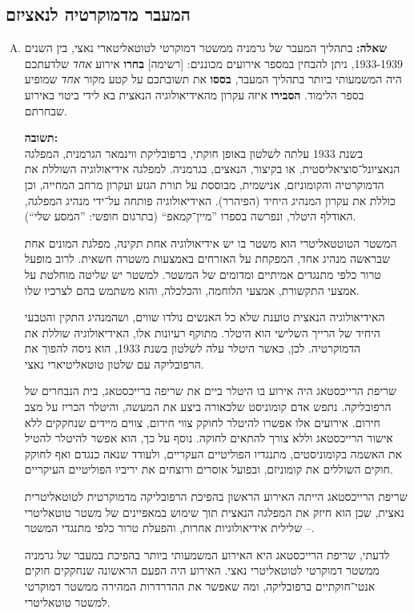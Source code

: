 \documentclass[a4paper]{article}
\begin{document}
	\subsection{המעבר מדמוקרטיה לנאציזם}
		\begin{enumerate}[A.]
			\item \textbf{שאלה: }
			בתהליך המעבר של גרמניה ממשטר דמוקרטי לטוטאליטארי נאצי, בין השנים 1933-1939, ניתן להבחין במספר אירועים מכוננים: [רשימה] \textbf{בחרו} אירוע \textit{אחד} שלדעתכם היה המשמעותי ביותר בתהליך המעבר, \textbf{בססו} את תשובתכם על קטע מקור \textit{אחד} שמופיע בספר הלימוד. \textbf{הסבירו} איזה עקרון מהאידיאולוגיה הנאצית בא לידי ביטוי באירוע שבחרתם. 
			
			\textbf{תשובה: }\\
			בשנת 1933 עלתה לשלטון באופן חוקתי, ברפובליקת ווינמאר הגרמנית, המפלגה הנאציונל־סוציאליסטית, או בקיצור, הנאצים, בגרמניה. למפלגה אידיאולוגיה השוללת את הדמוקרטיה והקומוניזם, אנישמית, מבוססת על תורת הגזע ועקרון מרחב המחייה, וכן כוללת את עקרון המנהיג היחיד (הפיהרר). האידיאולוגיה פותחה על־ידי מנהיג המפלגה, האודלף היטלר, ונפרשה בספרו ''מיין־קמאפ`` (בתרגום חופשי: ''המסע שלי``). 
			
			המשטר הטוטטאליטרי הוא משטר בו יש אידיאולוגיה אחת תקינה, מפלגת המונים אחת שבראשה מנהיג אחד, המפקחת על האזרחים באמצעות משטרה חשאית. לרוב מופעל טרור כלפי מתנגדים אמיתיים ומדומים של המשטר. למשטר יש שליטה מוחלטת על אמצעי התקשורת, אמצעי הלוחמה, והכלכלה, והוא משתמש בהם לצרכיו שלו. 
			
			האידיאולוגיה הנאצית טוענת שלא כל האנשים נולדו שווים, ושהמנהיג התקין והטבעי היחיד של הרייך השלישי הוא היטלר. מתוקף רעיונות אלו, האידיאולוגיה שוללת את הדמוקרטיה. לכן, כאשר היטלר עלה לשלטון בשנת 1933, הוא ניסה להפוך את הרפובליקה עם שלטון טוטאליטיארי נאצי. 
			
			שריפת הרייכסטאג היה אירוע בו היטלר ביים את שריפה ברייכסטאג, בית הנבחרים של הרפובליקה. נתפש אדם קומוניסט שלכאורה ביצע את המעשה, והיטלר הכריז על מצב חירום. אירועים אלו אפשרו להיטלר לחוקק צווי חירום, צווים מיידים שנחקקים ללא אישור הרייכסטאג וללא צורך להתאים לחוקה. נוסף על כך, הוא אפשר להיטלר להטיל את האשמה בקומוניסטים, מתנגדיו הפוליטיים העקריים, ולעודד שנאה כנגדם ואף לחוקק חוקים השוללים את קומוניזם, ובפועל אוסרים ורוצחים את יריביו הפוליטיים העיקריים. 
			
			שריפת הרייכסטאג הייתה האירוע הראשון בהפיכת הרפובליקה מדמוקרטית לטוטאליטרית נאצית, שכן הוא חיזק את המפלגה הנאצית תוך שימוש במאפיינים של משטר טוטאליטרי – שלילית אידיאולוגיות אחרות, והפעלת טרור כלפי מתנגדי המשטר. 
			
			לדעתי, שריפת הרייכסטאג היא האירוע המשמעותי ביותר בהפיכת במעבר של גרמניה ממשטר דמוקרטי לטוטאליטרי נאצי. האירוע היה הפעם הראשונה שנחקקים חוקים אנטי־חוקתיים ברפובליקה, ומה שאפשר את ההדרדרות המהירה ממשטר דמוקרטי למשטר טוטאליטרי. 
			

\end{enumerate}
\end{document}
